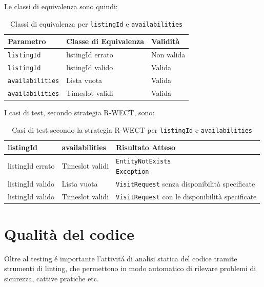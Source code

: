 Le classi di equivalenza sono quindi:
\begin{table}[H]
    \centering
    \renewcommand{\arraystretch}{1.4}
    \begin{tabularx}{\textwidth}{|X|X|X|}
    \hline
    \textbf{Parametro} & \textbf{Classe di Equivalenza} & \textbf{Validità} \\
    \hline
    \texttt{listingId} & listingId errato & Non valida \\
    \hline
    \texttt{listingId} & listingId valido & Valida \\
    \hline
    \texttt{availabilities} & Lista vuota & Valida \\
    \hline
    \texttt{availabilities} & Timeslot validi & Valida \\
    \hline
    \end{tabularx}
    \caption{Classi di equivalenza per \texttt{listingId} e \texttt{availabilities}}
\end{table}

I casi di test, secondo strategia R-WECT, sono:
\begin{table}[H]
    \centering
    \renewcommand{\arraystretch}{1.4}
    \begin{tabularx}{\textwidth}{|X|X|X|}
    \hline
    \textbf{listingId} & \textbf{availabilities} & \textbf{Risultato Atteso} \\
    \hline
    listingId errato & Timeslot validi & \makecell[l]{\texttt{EntityNotExists}\\\texttt{Exception}} \\
    \hline
    listingId valido & Lista vuota & \texttt{VisitRequest} senza disponibilità specificate \\
    \hline
    listingId valido & Timeslot validi & \texttt{VisitRequest} con le disponibilità specificate \\
    \hline
    \end{tabularx}
    \caption{Casi di test secondo la strategia R-WECT per \texttt{listingId} e \texttt{availabilities}}
    \end{table}

\newpage


\section{Qualità del codice}
Oltre al testing é importante l'attivitá di analisi statica del codice
tramite strumenti di linting, che permettono in modo automatico di
rilevare problemi di sicurezza, cattive pratiche etc.

